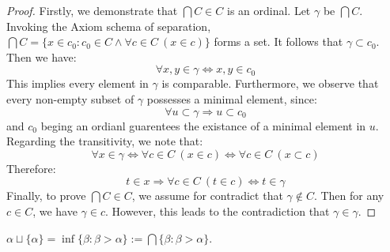 \begin{proof}
  Firstly, we demonstrate that $\bigcap C \in C$ is an ordinal. Let $\gamma$ be $\bigcap C$. Invoking the Axiom schema of separation, $\bigcap C = \{ x\in c_0: c_0 \in C \land \forall c \in C \ (x \in c) \}$ forms a set. It follows that $\gamma \subset c_0$. Then we have:
  \[
      \forall x, y \in \gamma \Leftrightarrow x, y \in c_0
  \]
  This implies every element in $\gamma$ is comparable. Furthermore, we observe that every non-empty subset of $\gamma$ possesses a minimal element, since:
  \[
      \forall u \subset \gamma \Rightarrow u \subset c_0 
  \]
  and $c_0$ beging an ordianl guarentees the existance of a minimal element in $u$.
  Regarding the transitivity, we note that:
  \[
    \forall x \in \gamma \Leftrightarrow \forall c \in C \ (x \in c) \Leftrightarrow \forall c \in C \ (x \subset c)
  \]
  Therefore:
  \[
    t \in x \Rightarrow \forall c \in C \ (t \in c) \Leftrightarrow t \in \gamma
  \]
  Finally, to prove $\bigcap C \in C$, we assume for contradict that $\gamma \notin C$. Then for any $c \in C$, we have $\gamma \in c$. However, this leads to the contradiction that $\gamma \in \gamma$.
\end{proof}






\begin{corollary}
  $\alpha \sqcup \{ \alpha \} = \inf \{ \beta: \beta > \alpha \}:= \bigcap \{ \beta: \beta > \alpha \}$.
\end{corollary}

